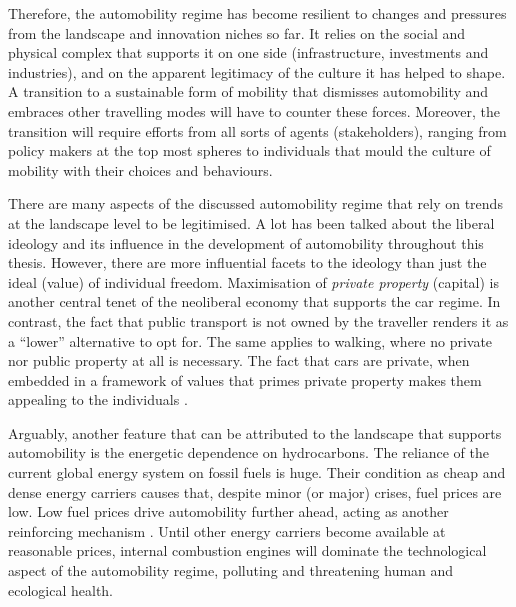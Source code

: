 Therefore, the automobility regime has become resilient to changes and pressures from the landscape and innovation niches so far. It relies on the social and physical complex that supports it on one side (infrastructure, investments and industries), and on the apparent legitimacy of the culture it has helped to shape. A transition to a sustainable form of mobility that dismisses automobility and embraces other travelling modes will have to counter these forces. Moreover, the transition will require efforts from all sorts of agents (stakeholders), ranging from policy makers at the top most spheres to individuals that mould the culture of mobility with their choices and behaviours.

There are many aspects of the discussed automobility regime that rely on trends at the landscape level to be legitimised. A lot has been talked about the liberal ideology and its influence in the development of automobility throughout this thesis. However, there are more influential facets to the ideology than just the ideal (value) of individual freedom. Maximisation of \emph{private property} (capital) is another central tenet of the neoliberal economy that supports the car regime. In contrast, the fact that public transport is not owned by the traveller renders it as a ``lower'' alternative to opt for. The same applies to walking, where no private nor public property at all is necessary. The fact that cars are private, when embedded in a framework of values that primes private property makes them appealing to the individuals \parencite{zijlstra2012_SocioSpatialPerspective}.

Arguably, another feature that can be attributed to the landscape that supports automobility is the energetic dependence on hydrocarbons. The reliance of the current global energy system on fossil fuels is huge. Their condition as cheap and dense energy carriers causes that, despite minor (or major) crises, fuel prices are low. Low fuel prices drive automobility further ahead, acting as another reinforcing mechanism \parencite{wells2012_NatureCausesInertia}. Until other energy carriers become available at reasonable prices, internal combustion engines will dominate the technological aspect of the automobility regime, polluting and threatening human and ecological health.

